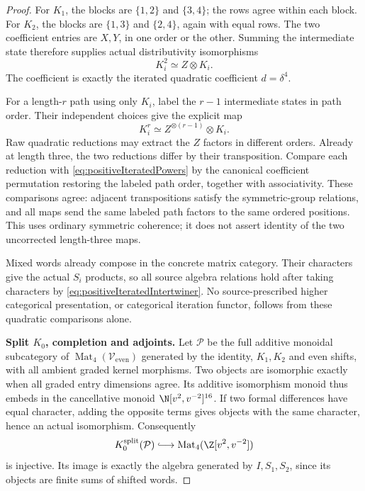 \documentclass[11pt,a4paper]{article}
\theoremstyle{named}\newtheorem{finding}{Finding}[section]
\theoremstyle{definition}\newtheorem{definition}[finding]{Definition}
\theoremstyle{remark}\newtheorem{remark}[finding]{Remark}
\begin{document}
\begin{proof}
For \(K_1\), the blocks are \(\{1,2\}\) and
\(\{3,4\}\); the rows agree within each block.
For \(K_2\), the blocks are \(\{1,3\}\) and
\(\{2,4\}\), again with equal rows.
The two coefficient entries are \(X,Y\), in one
order or the other. Summing the intermediate state
therefore supplies actual distributivity isomorphisms
\begin{equation}\label{eq:positiveIteratedQuadratic}
                             K_i^2\simeq Z\otimes K_i.
\end{equation}
The coefficient is exactly the iterated quadratic
coefficient \(d=\delta^4\).

For a length-\(r\) path using only \(K_i\), label
the \(r-1\) intermediate states in path order.
Their independent choices give the explicit map
\begin{equation}\label{eq:positiveIteratedPowers}
                       K_i^r\simeq
                          Z^{\otimes(r-1)}\otimes K_i.
\end{equation}
Raw quadratic reductions may extract the \(Z\)
factors in different orders. Already at length three,
the two reductions differ by their transposition.
Compare each reduction with
\eqref{eq:positiveIteratedPowers} by the canonical
coefficient permutation restoring the labeled path
order, together with associativity.
These comparisons agree: adjacent transpositions
satisfy the symmetric-group relations, and all maps
send the same labeled path factors to the same
ordered positions. This uses ordinary symmetric
coherence; it does not assert identity of the two
uncorrected length-three maps.

Mixed words already compose in the concrete matrix
category. Their characters give the actual \(S_i\)
products, so all source algebra relations hold after
taking characters by
\eqref{eq:positiveIteratedIntertwiner}.
No source-prescribed higher categorical presentation,
or categorical iteration functor, follows from these
quadratic comparisons alone.

\par\smallskip\noindent\textbf{Split \(K_0\), completion and adjoints.}\quad
Let \(\mathcal P\) be the full additive monoidal
subcategory of \(\operatorname{Mat}_4(\mathcal
V_{\mathrm{even}})\) generated by the identity,
\(K_1,K_2\) and even shifts, with all ambient graded
kernel morphisms.
Two objects are isomorphic exactly when all graded
entry dimensions agree. Its additive isomorphism
monoid thus embeds in the cancellative monoid
\(\N[v^2,v^{-2}]^{16}\).
If two formal differences have equal character,
adding the opposite terms gives objects with the
same character, hence an actual isomorphism.
Consequently
\[
 K_0^{\mathrm{split}}(\mathcal P)
       \lhook\joinrel\longrightarrow
            \operatorname{Mat}_4(\Z[v^2,v^{-2}])
\]
is injective. Its image is exactly the algebra
generated by \(I,S_1,S_2\), since its objects are
finite sums of shifted words.


\end{proof}
\end{document}
